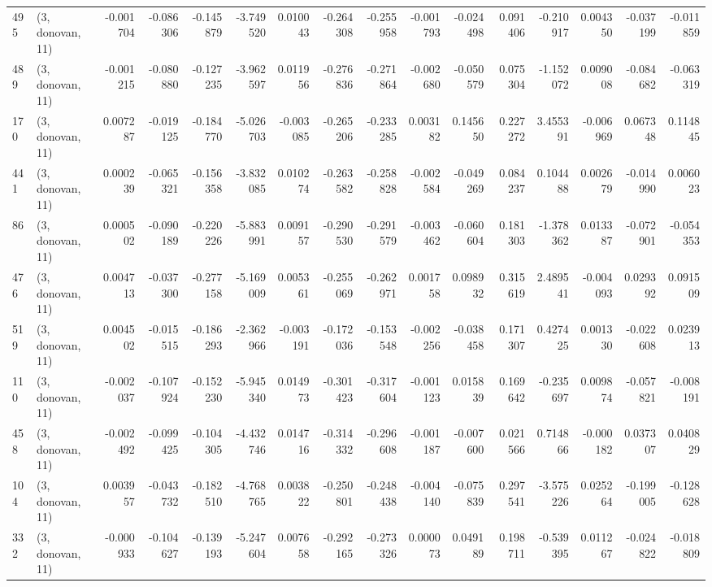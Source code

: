 \begin{tabular}{llrrrrrrrrrrrrrr}
495 &  (3, donovan, 11) &  -0.001704 & -0.086306 & -0.145879 &   -3.749520 &  0.010043 &  -0.264308 & -0.255958 & -0.001793 & -0.024498 &  0.091406 &   -0.210917 &  0.004350 & -0.037199 & -0.011859 \\
489 &  (3, donovan, 11) &  -0.001215 & -0.080880 & -0.127235 &   -3.962597 &  0.011956 &  -0.276836 & -0.271864 & -0.002680 & -0.050579 &  0.075304 &   -1.152072 &  0.009008 & -0.084682 & -0.063319 \\
170 &  (3, donovan, 11) &   0.007287 & -0.019125 & -0.184770 &   -5.026703 & -0.003085 &  -0.265206 & -0.233285 &  0.003182 &  0.145650 &  0.227272 &    3.455391 & -0.006969 &  0.067348 &  0.114845 \\
441 &  (3, donovan, 11) &   0.000239 & -0.065321 & -0.156358 &   -3.832085 &  0.010274 &  -0.263582 & -0.258828 & -0.002584 & -0.049269 &  0.084237 &    0.104488 &  0.002679 & -0.014990 &  0.006023 \\
86  &  (3, donovan, 11) &   0.000502 & -0.090189 & -0.220226 &   -5.883991 &  0.009157 &  -0.290530 & -0.291579 & -0.003462 & -0.060604 &  0.181303 &   -1.378362 &  0.013387 & -0.072901 & -0.054353 \\
476 &  (3, donovan, 11) &   0.004713 & -0.037300 & -0.277158 &   -5.169009 &  0.005361 &  -0.255069 & -0.262971 &  0.001758 &  0.098932 &  0.315619 &    2.489541 & -0.004093 &  0.029392 &  0.091509 \\
519 &  (3, donovan, 11) &   0.004502 & -0.015515 & -0.186293 &   -2.362966 & -0.003191 &  -0.172036 & -0.153548 & -0.002256 & -0.038458 &  0.171307 &    0.427425 &  0.001330 & -0.022608 &  0.023913 \\
110 &  (3, donovan, 11) &  -0.002037 & -0.107924 & -0.152230 &   -5.945340 &  0.014973 &  -0.301423 & -0.317604 & -0.001123 &  0.015839 &  0.169642 &   -0.235697 &  0.009874 & -0.057821 & -0.008191 \\
458 &  (3, donovan, 11) &  -0.002492 & -0.099425 & -0.104305 &   -4.432746 &  0.014716 &  -0.314332 & -0.296608 & -0.001187 & -0.007600 &  0.021566 &    0.714866 & -0.000182 &  0.037307 &  0.040829 \\
104 &  (3, donovan, 11) &   0.003957 & -0.043732 & -0.182510 &   -4.768765 &  0.003822 &  -0.250801 & -0.248438 & -0.004140 & -0.075839 &  0.297541 &   -3.575226 &  0.025264 & -0.199005 & -0.128628 \\
332 &  (3, donovan, 11) &  -0.000933 & -0.104627 & -0.139193 &   -5.247604 &  0.007658 &  -0.292165 & -0.273326 &  0.000073 &  0.049189 &  0.198711 &   -0.539395 &  0.011267 & -0.024822 & -0.018809 \\

\end{tabular}
